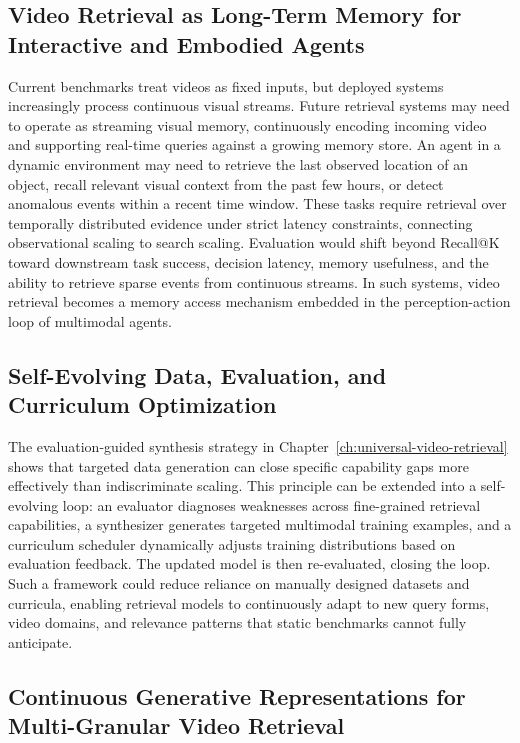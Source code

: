 \subsection{Video Retrieval as Long-Term Memory for Interactive and Embodied Agents}

Current benchmarks treat videos as fixed inputs, but deployed systems increasingly process continuous visual streams. Future retrieval systems may need to operate as streaming visual memory, continuously encoding incoming video and supporting real-time queries against a growing memory store. An agent in a dynamic environment may need to retrieve the last observed location of an object, recall relevant visual context from the past few hours, or detect anomalous events within a recent time window. These tasks require retrieval over temporally distributed evidence under strict latency constraints, connecting observational scaling to search scaling. Evaluation would shift beyond Recall@K toward downstream task success, decision latency, memory usefulness, and the ability to retrieve sparse events from continuous streams. In such systems, video retrieval becomes a memory access mechanism embedded in the perception-action loop of multimodal agents.

\subsection{Self-Evolving Data, Evaluation, and Curriculum Optimization}

The evaluation-guided synthesis strategy in Chapter~\ref{ch:universal-video-retrieval} shows that targeted data generation can close specific capability gaps more effectively than indiscriminate scaling. This principle can be extended into a self-evolving loop: an evaluator diagnoses weaknesses across fine-grained retrieval capabilities, a synthesizer generates targeted multimodal training examples, and a curriculum scheduler dynamically adjusts training distributions based on evaluation feedback. The updated model is then re-evaluated, closing the loop. Such a framework could reduce reliance on manually designed datasets and curricula, enabling retrieval models to continuously adapt to new query forms, video domains, and relevance patterns that static benchmarks cannot fully anticipate.

\subsection[Continuous Generative Representations for Multi-Granular Video Retrieval]{Continuous Generative Representations for\\Multi-Granular Video Retrieval}


